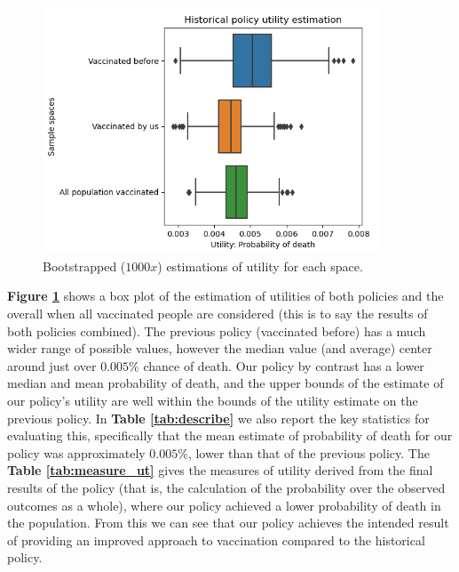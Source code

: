 \documentclass{article}
\begin{document}
\begin{figure}[H]
    \centering
    \includegraphics[width=10cm]{pictures/utility_estimations.png}
    \caption{Bootstrapped ($1000x$) estimations of utility for each space.}
    \label{fig: utility estimation}
\end{figure}

\textbf{Figure \ref{fig: utility estimation}} shows a box plot of the estimation of utilities of both policies and the overall when all vaccinated people are considered (this is to say the results of both policies combined). The previous policy (vaccinated before) has a much wider range of possible values, however the median value (and average) center around just over $0.005\%$ chance of death. Our policy by contrast has a lower median and mean probability of death, and the upper bounds of the estimate of our policy's utility are well within the bounds of the utility estimate on the previous policy. In \textbf{Table \ref{tab:describe}} we also report the key statistics for evaluating this, specifically that the mean estimate of probability of death for our policy was approximately $0.005\%$, lower than that of the previous policy. The \textbf{Table \ref{tab:measure_ut}} gives the measures of utility derived from the final results of the policy (that is, the calculation of the probability over the observed outcomes as a whole), where our policy achieved a lower probability of death in the population. From this we can see that our policy achieves the intended result of providing an improved approach to vaccination compared to the historical policy.
\end{document}
